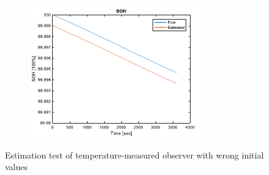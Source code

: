 \documentclass[12pt]{article}
\begin{document}
\begin{figure}[H]
\begin{subfigure}[t]{0.3\linewidth}
		\includegraphics[width=\linewidth]{figures/estTempIni5.pdf}
	\end{subfigure}	
	\caption{Estimation test of temperature-measured observer with wrong initial values}\label{fig:estTempIni}
\end{figure}
\end{document}
